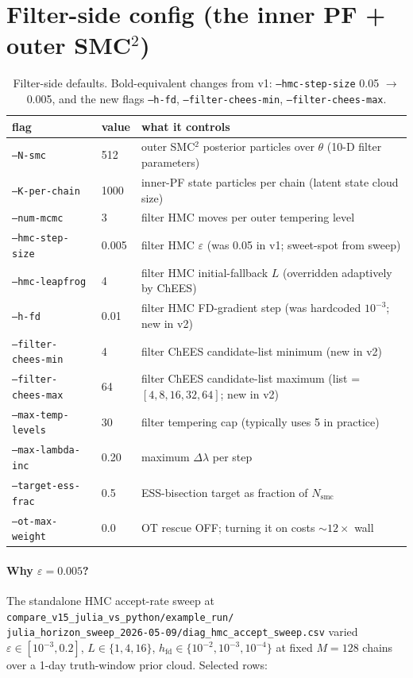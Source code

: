 \documentclass[11pt,a4paper]{article}
\begin{document}
\section{Filter-side config (the inner PF + outer SMC$^2$)}
\label{sec:filter_cfg}

\begin{table}[ht]
\centering
\small
\begin{tabular}{lll}
\toprule
flag & value & what it controls \\
\midrule
\texttt{--N-smc}             & 512  & outer SMC$^2$ posterior particles over $\theta$ (10-D filter parameters) \\
\texttt{--K-per-chain}       & 1000 & inner-PF state particles per chain (latent state cloud size) \\
\texttt{--num-mcmc}          & 3    & filter HMC moves per outer tempering level \\
\texttt{--hmc-step-size}     & 0.005 & filter HMC $\varepsilon$ (was 0.05 in v1; sweet-spot from sweep) \\
\texttt{--hmc-leapfrog}      & 4    & filter HMC initial-fallback $L$ (overridden adaptively by ChEES) \\
\texttt{--h-fd}              & 0.01 & filter HMC FD-gradient step (was hardcoded $10^{-3}$; new in v2) \\
\texttt{--filter-chees-min}  & 4    & filter ChEES candidate-list minimum (new in v2) \\
\texttt{--filter-chees-max}  & 64   & filter ChEES candidate-list maximum (list = $[4, 8, 16, 32, 64]$; new in v2) \\
\texttt{--max-temp-levels}   & 30   & filter tempering cap (typically uses 5 in practice) \\
\texttt{--max-lambda-inc}    & 0.20 & maximum $\Delta\lambda$ per step \\
\texttt{--target-ess-frac}   & 0.5  & ESS-bisection target as fraction of $N_{\mathrm{smc}}$ \\
\texttt{--ot-max-weight}     & 0.0  & OT rescue OFF; turning it on costs $\sim 12\times$ wall \\
\bottomrule
\end{tabular}
\caption{Filter-side defaults. Bold-equivalent changes from v1:
\texttt{--hmc-step-size} 0.05 $\to$ 0.005, and the new flags
\texttt{--h-fd}, \texttt{--filter-chees-min},
\texttt{--filter-chees-max}.}
\label{tab:filter_cfg}
\end{table}

\paragraph{Why $\varepsilon = 0.005$?} The standalone HMC accept-rate
sweep at
\texttt{compare\_v15\_julia\_vs\_python/example\_run/}\\
\texttt{julia\_horizon\_sweep\_2026-05-09/diag\_hmc\_accept\_sweep.csv}
varied $\varepsilon \in [10^{-3}, 0.2]$, $L \in \{1, 4, 16\}$,
$h_{\mathrm{fd}} \in \{10^{-2}, 10^{-3}, 10^{-4}\}$ at fixed $M = 128$
chains over a 1-day truth-window prior cloud. Selected rows:
\end{document}
